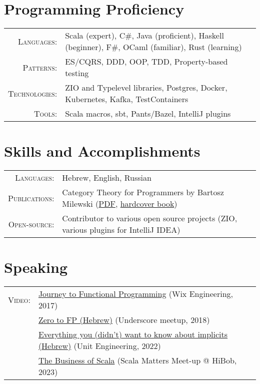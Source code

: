 \documentclass[a4paper,11pt]{article}
\begin{document}
\section{Programming Proficiency}
\begin{tabular}{rl}
  \textsc{Languages:}& Scala (expert), C\#, Java (proficient), Haskell (beginner), F\#, OCaml (familiar), Rust (learning)\\
  \textsc{Patterns:}& ES/CQRS, DDD, OOP, TDD, Property-based testing\\
  \textsc{Technologies:}& ZIO and Typelevel libraries, Postgres, Docker, Kubernetes, Kafka, TestContainers\\
  \textsc{Tools:}& Scala macros, sbt, Pants/Bazel, IntelliJ plugins\\
\end{tabular}

\section{Skills and Accomplishments}
\begin{tabular}{rl}
  \textsc{Languages:}& Hebrew, English, Russian\\
  \textsc{Publications:}& Category Theory for Programmers by Bartosz Milewski (\href{https://github.com/hmemcpy/milewski-ctfp-pdf}{PDF}, \href{https://www.blurb.com/b/9621951-category-theory-for-programmers-new-edition-hardco}{hardcover book})\\
  \textsc{Open-source:}&Contributor to various open source projects (ZIO, various plugins for IntelliJ IDEA)
\end{tabular}

\section{Speaking}
\begin{tabular}{rl}
  \textsc{Video:}&\href{https://www.youtube.com/watch?v=g1EvM4CbUvM}{Journey to Functional Programming} (Wix Engineering, 2017)\\
  &\href{https://www.youtube.com/watch?v=N6ZJwnvTjLA}{Zero to FP (Hebrew)} (Underscore meetup, 2018)\\
  &\href{https://www.youtube.com/watch?v=qBmZJwmd0CA}{Everything you (didn't) want to know about implicits (Hebrew)} (Unit Engineering, 2022)\\
  &\href{https://www.youtube.com/watch?v=eILoMm9t4rI}{The Business of Scala} (Scala Matters Meet-up @ HiBob, 2023)\\  
\end{tabular}
\end{document}
